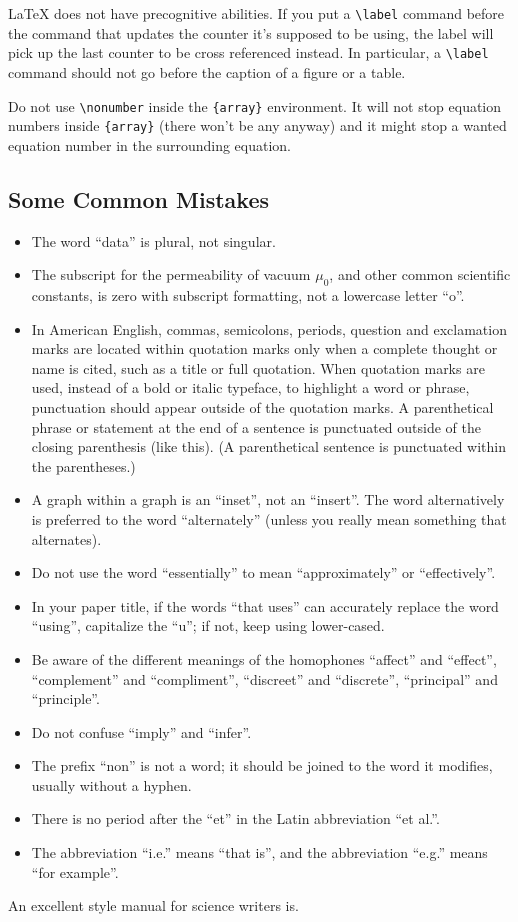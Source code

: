 \documentclass[conference]{IEEEtran}
\begin{document}
{\LaTeX} does not have precognitive abilities. If you put a
\verb|\label| command before the command that updates the counter it's
supposed to be using, the label will pick up the last counter to be
cross referenced instead. In particular, a \verb|\label| command
should not go before the caption of a figure or a table.

Do not use \verb|\nonumber| inside the \verb|{array}| environment. It
will not stop equation numbers inside \verb|{array}| (there won't be
any anyway) and it might stop a wanted equation number in the
surrounding equation.

\subsection{Some Common Mistakes}\label{SCM}
\begin{itemize}
\item The word ``data'' is plural, not singular.
\item The subscript for the permeability of vacuum $\mu_{0}$, and other common scientific constants, is zero with subscript formatting, not a lowercase letter ``o''.
\item In American English, commas, semicolons, periods, question and exclamation marks are located within quotation marks only when a complete thought or name is cited, such as a title or full quotation. When quotation marks are used, instead of a bold or italic typeface, to highlight a word or phrase, punctuation should appear outside of the quotation marks. A parenthetical phrase or statement at the end of a sentence is punctuated outside of the closing parenthesis (like this). (A parenthetical sentence is punctuated within the parentheses.)
\item A graph within a graph is an ``inset'', not an ``insert''. The word alternatively is preferred to the word ``alternately'' (unless you really mean something that alternates).
\item Do not use the word ``essentially'' to mean ``approximately'' or ``effectively''.
\item In your paper title, if the words ``that uses'' can accurately replace the word ``using'', capitalize the ``u''; if not, keep using lower-cased.
\item Be aware of the different meanings of the homophones ``affect'' and ``effect'', ``complement'' and ``compliment'', ``discreet'' and ``discrete'', ``principal'' and ``principle''.
\item Do not confuse ``imply'' and ``infer''.
\item The prefix ``non'' is not a word; it should be joined to the word it modifies, usually without a hyphen.
\item There is no period after the ``et'' in the Latin abbreviation ``et al.''.
\item The abbreviation ``i.e.'' means ``that is'', and the abbreviation ``e.g.'' means ``for example''.
\end{itemize}
An excellent style manual for science writers is.
\end{document}
